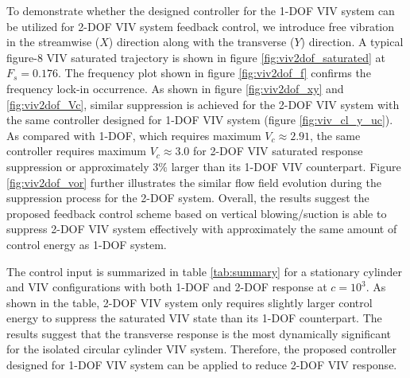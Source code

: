 \documentclass[standard]{jfm}
\begin{document}
To demonstrate whether the designed controller for the 1-DOF VIV system can be utilized for 
2-DOF VIV system feedback control, we introduce free vibration in the streamwise ($X$) direction along with the transverse ($Y$) direction.
A typical figure-8 VIV saturated trajectory is shown in figure \ref{fig:viv2dof_saturated} at $F_s=0.176$. 
The frequency plot shown in figure \ref{fig:viv2dof_f} confirms the frequency lock-in occurrence. 
As shown in figure \ref{fig:viv2dof_xy} and \ref{fig:viv2dof_Vc}, 
similar suppression is achieved for the 2-DOF VIV
system with the same controller designed for 1-DOF VIV 
system (figure \ref{fig:viv_cl_y_uc}). As compared with 1-DOF, which requires maximum $V_c \approx 2.91$, 
the same controller requires maximum $V_c \approx 3.0$ for 2-DOF VIV saturated response suppression or approximately
$3 \%$ larger than its 1-DOF VIV counterpart. 
Figure \ref{fig:viv2dof_vor} further illustrates the similar flow field evolution during the suppression process for 
the 2-DOF system. Overall, the results suggest the proposed feedback control scheme based on vertical blowing/suction 
is able to suppress 2-DOF VIV system effectively with approximately the same amount of control energy as 1-DOF system. 
%

The control input is summarized in table \ref{tab:summary} for a stationary cylinder and VIV configurations with both 1-DOF and 2-DOF  response at $c=10^3$. 
As shown in the table, 2-DOF VIV system only requires slightly larger control energy to suppress the saturated VIV state than its 1-DOF counterpart. 
The results suggest that the transverse response is the most dynamically significant for the isolated circular cylinder VIV system. 
Therefore, the proposed controller designed for 1-DOF VIV system can be applied to reduce 2-DOF VIV response. 
\end{document}
